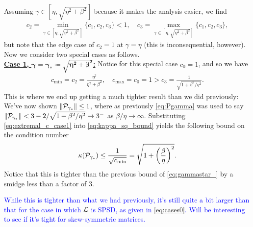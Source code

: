 \documentclass[a4paper,10pt]{article}
\newcommand{\tcb}{\textcolor{blue}}
\begin{document}
Assuming $\gamma \in [\eta, \sqrt{\eta^2 + \beta^2}]$ because it makes the analysis easier, we find
\begin{align} 
\label{eq:c_partial}
c_2 = \underset{\gamma \in [\eta , \sqrt{\eta^2 + \beta^2}]}{\min} \{c_1, c_2, c_3 \} < 1, \quad c_3 = \underset{\gamma \in [\eta, \sqrt{\eta^2 + \beta^2}]}{\max} \{c_1, c_2, c_3 \},
\end{align}
but note that the edge case of $c_2 = 1$ at $\gamma = \eta$ (this is inconsequential, however). Now we consider two special cases as follows.\\

\underline{\textbf{Case 1,} $\bm{\gamma = \gamma_* \coloneqq \sqrt{\eta^2 + \beta^2}}$\textbf{:}} Notice for this special case $c_0 = 1$, and so we have
\begin{align}
\label{eq:extremal_c_case1}
c_{\min} = c_2 = \frac{\eta^2}{\eta^2 + \beta^2}, \quad c_{\max} = c_0 = 1 > c_3 = \frac{1}{\sqrt{1 + \beta^2/\eta^2}}.
\end{align}
This is where we end up getting a much tighter result than we did previously: We've now shown $\Vert {\cal P}_{\gamma_*} \Vert \leq 1$, where as previously \eqref{eq:Pgamma} was used to say $\Vert {\cal P}_{\gamma_*} \Vert < 3 - 2/\sqrt{1 + \beta^2 / \eta^2} \to 3^-$ as $\beta/\eta \to \infty$.
%
Substituting \eqref{eq:extremal_c_case1} into \eqref{eq:kappa_sq_bound} yields the following bound on the condition number
\begin{align} \label{eq:kappa_case1}
\kappa({\cal P}_{\gamma_*}) \leq \frac{1}{\sqrt{c_{\rm min}}} = \sqrt{1 + \left( \frac{\beta}{\eta} \right)^2}.
\end{align}
Notice that this is tighter than the previous bound of \eqref{eq:gammastar_} by a smidge less than a factor of 3.

\tcb{While this is tighter than what we had previously, it's still quite a bit larger than that for the case in which ${\cal L}$ is SPSD, as given in \eqref{eq:cases0}. Will be interesting to see if it's tight for skew-symmetric matrices.}\\
\end{document}
